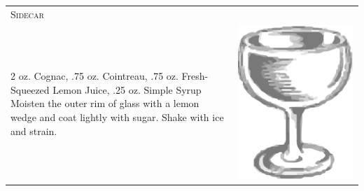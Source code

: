 \documentclass{article}
\begin{document}
\begin{multicols}{2}
\begin{tabular}{p{2in} p{0.5in}}
\multicolumn{2}{p{3in}}{\centering\Huge\textsc{Sidecar}} \\ 
   \vspace{-0.1in}2 oz. Cognac, .75 oz. Cointreau, .75 oz.  Fresh-Squeezed Lemon Juice, .25 oz. Simple Syrup Moisten the outer rim of glass with a lemon wedge and coat lightly with sugar. Shake with ice and strain. &  
   \vspace{-0.1in} \includegraphics{coupe.png}
\end{tabular}


\end{multicols}
\end{document}
